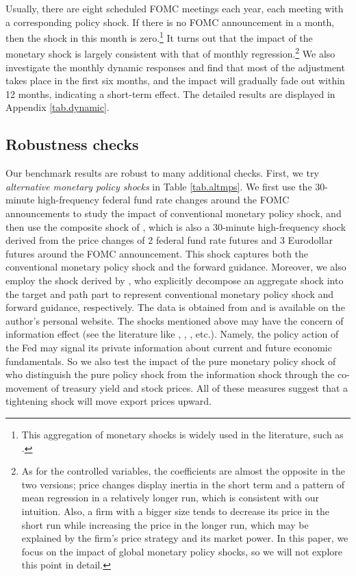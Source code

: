 Usually, there are eight scheduled FOMC meetings each year, each meeting with a corresponding policy shock. If there is no FOMC announcement in a month, then the shock in this month is zero.\footnote{This aggregation of monetary shocks is widely used in the literature, such as \cite{chari2021Taper}.} It turns out that the impact of the monetary shock is largely consistent with that of monthly regression.\footnote{As for the controlled variables, the coefficients are almost the opposite in the two versions; price changes display inertia in the short term and a pattern of mean regression in a relatively longer run, which is consistent with our intuition. Also, a firm with a bigger size tends to decrease its price in the short run while increasing the price in the longer run, which may be explained by the firm's price strategy and its market power. In this paper, we focus on the impact of global monetary policy shocks, so we will not explore this point in detail.} We also investigate the monthly dynamic responses and find that most of the adjustment takes place in the first six months, and the impact will gradually fade out within 12 months, indicating a short-term effect. The detailed results are displayed in Appendix \ref{tab.dynamic}.

\subsection{Robustness checks}

Our benchmark results are robust to many additional checks. First, we try \textit{alternative monetary policy shocks} in Table \ref{tab.altmps}. We first use the 30-minute high-frequency federal fund rate changes around the FOMC announcements to study the impact of conventional monetary policy shock, and then use the composite shock of \cite{nakamura2018high}, which is also a 30-minute high-frequency shock derived from the price changes of 2 federal fund rate futures and 3 Eurodollar futures around the FOMC announcement. This shock captures both the conventional monetary policy shock and the forward guidance. Moreover, we also employ the shock derived by \cite{guraynak2005actions}, who explicitly decompose an aggregate shock into the target and path part to represent conventional monetary policy shock and forward guidance, respectively. The data is obtained from \cite{acosta2022perceived} and is available on the author's personal website. The shocks mentioned above may have the concern of information effect (see the literature like \cite{nakamura2018high}, \cite{jarocinski2020deconstructing}, \cite{acosta2022perceived}, etc.). Namely, the policy action of the Fed may signal its private information about current and future economic fundamentals. So we also test the impact of the pure monetary policy shock of \cite{jarocinski2020deconstructing} who distinguish the pure policy shock from the information shock through the co-movement of treasury yield and stock prices. All of these measures suggest that a tightening shock will move export prices upward.

